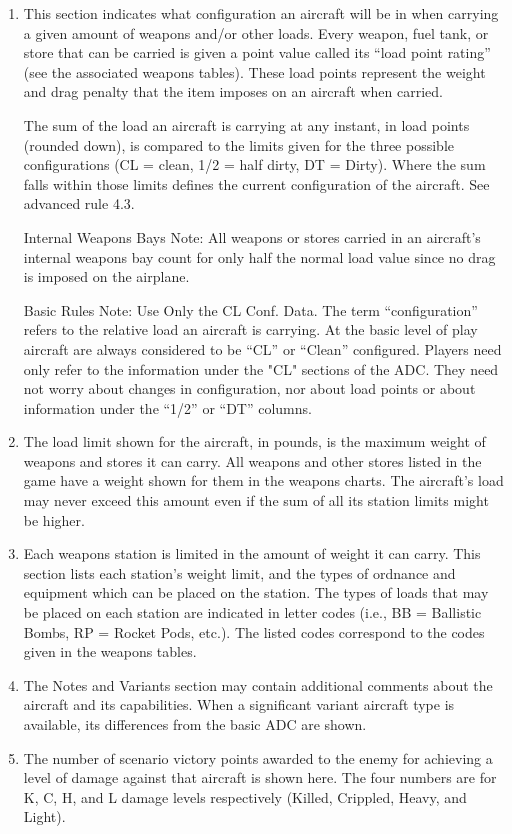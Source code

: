 \begin{enumerate}[resume]
    \item {} This section indicates what configuration an aircraft will be in when carrying a given amount of weapons and/or other loads. Every weapon, fuel tank, or store that can be carried is given a point value called its “load point rating” (see the associated weapons tables). These load points represent the weight and drag penalty that the item imposes on an aircraft when carried.

    The sum of the load an aircraft is carrying at any instant, in load points (rounded down), is compared to the limits given for the three possible configurations (CL = clean, 1/2 = half dirty, DT = Dirty). Where the sum falls within those limits defines the current configuration of the aircraft. See advanced rule 4.3.

    Internal Weapons Bays Note:  All weapons or stores carried in an aircraft's internal weapons bay count for only half the normal load value since no drag is imposed on the airplane.

    Basic Rules Note:  Use Only the CL Conf. Data. The term “configuration” refers to the relative load an aircraft is carrying. At the basic level of play aircraft are always considered to be “CL” or “Clean” configured. Players need only refer to the information under the "CL" sections of the ADC. They need not worry about changes in configuration, nor about load points or about information under the “1/2” or “DT” columns.

    \item {} The load limit shown for the aircraft, in pounds, is the maximum weight of weapons and stores it can carry. All weapons and other stores listed in the game have a weight shown for them in the weapons charts. The aircraft's load may never exceed this amount even if the sum of all its station limits might be higher.

    \item {} Each weapons station is limited in the amount of weight it can carry. This section lists each station's weight limit, and the types of ordnance and equipment which can be placed on the station. The types of loads that may be placed on each station are indicated in letter codes (i.e., BB = Ballistic Bombs, RP = Rocket Pods, etc.). The listed codes correspond to the codes given in the weapons tables.

    \item {} The Notes and Variants section may contain additional comments about the aircraft and its capabilities. When a significant variant aircraft type is available, its differences from the basic ADC are shown.

    \item {} The number of scenario victory points awarded to the enemy for achieving a level of damage against that aircraft is shown here. The four numbers are for K, C, H, and L damage levels respectively (Killed, Crippled, Heavy, and Light).

\end{enumerate}

